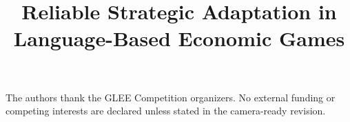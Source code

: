 \documentclass{article}
\title{Reliable Strategic Adaptation in Language-Based Economic Games}
\author{\PaperAuthors}
\begin{document}
\maketitle









\begin{ack}
The authors thank the GLEE Competition organizers. No external funding or
competing interests are declared unless stated in the camera-ready revision.
\end{ack}




\newpage

\end{document}
